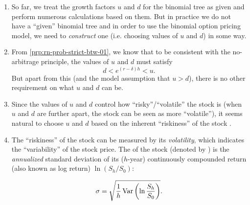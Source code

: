 \begin{enumerate}
\item So far, we treat the growth factors \(u\) and \(d\) for the binomial tree
as given and perform numerous calculations based on them. But in practice we do
not have a ``given'' binomial tree and in order to use the binomial option
pricing model, we need to \emph{construct} one (i.e. choosing values of \(u\)
and \(d\)) in some way.

\item \label{it:tree-ud-bounds}
From \cref{prp:rn-prob-strict-btw-01}, we know that to be consistent with
the no-arbitrage principle, the values of \(u\) and \(d\) must satisfy
\[
d<e^{(r-\delta)h}<u.
\]
But apart from this (and the model assumption that \(u>d\)), there is no other
requirement on what \(u\) and \(d\) can be.

\item Since the values of \(u\) and \(d\) control how ``risky''/``volatile'' the stock
 is (when \(u\) and \(d\) are further apart, the stock
 can be seen as more ``volatile''), it seems natural to
choose \(u\) and \(d\) based on the inherent ``riskiness'' of the stock
.

\item \label{it:volatility}
The ``riskiness'' of the stock  can be measured by its
\emph{volatility}, which indicates the ``variability'' of the stock price. The
 of the stock  (denoted by
) is the \emph{annualized} standard deviation of its
(\(h\)-year) continuously compounded return (also known as log return) \(\ln
(S_h/S_0)\):

\[
\sigma=\sqrt{\frac{1}{h}\operatorname{Var}\qty(\ln\frac{S_h}{S_0})}.
\]
\end{enumerate}
